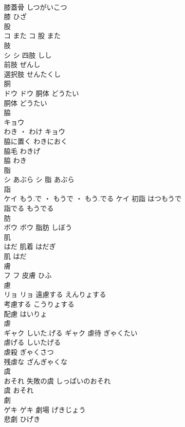 \documentclass[8pt]{extreport}
\begin{document}
\begin{CJK}{UTF8}{min}
\\	膝蓋骨	しつがいこつ	
\\	膝	ひざ	
\\	股	
\\	コ	また	コ													股	また	
\\	肢	
\\	シ		シ	四肢	しし	
\\	前肢	ぜんし	
\\	選択肢	せんたくし	
\\	胴	
\\	ドウ		ドウ	胴体	どうたい	
\\	胴体	どうたい	
\\	脇	
\\	キョウ
\\	わき ・ わけ	キョウ
\\	脇に置く	わきにおく	
\\	脇毛	わきげ	
\\	脇	わき	
\\	脂	
\\	シ	あぶら	シ													脂	あぶら	
\\	詣	
\\	ケイ	もう.で ・ もうで ・ もう.でる	ケイ	初詣	はつもうで	
\\	詣でる	もうでる	
\\	肪	
\\	ボウ		ボウ													脂肪	しぼう	
\\	肌	
\\	はだ		肌着	はだぎ	
\\	肌	はだ	
\\	膚	
\\	フ		フ													皮膚	ひふ	
\\	慮	
\\	リョ		リョ	遠慮する	えんりょする	
\\	考慮する	こうりょする	
\\	配慮	はいりょ	
\\	虐	
\\	ギャク	しいた.げる	ギャク	虐待	ぎゃくたい	
\\	虐げる	しいたげる	
\\	虐殺	ぎゃくさつ	
\\	残虐な	ざんぎゃくな	
\\	虞	
\\	おそれ		失敗の虞	しっぱいのおそれ	
\\	虞	おそれ	
\\	劇	
\\	ゲキ		ゲキ	劇場	げきじょう	
\\	悲劇	ひげき	

\end{CJK}
\end{document}
